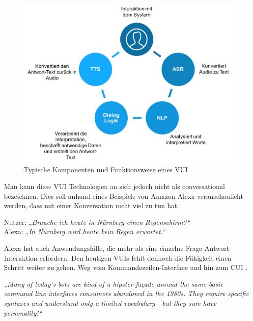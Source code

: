 \begin{figure}[!htb]
    \centering
    \includegraphics[width=\textwidth]{bilder/2_cuiFunktionsweise.png}
    \caption{Typische Komponenten und Funktionsweise eines VUI}
    \label{fig:cui-funktionsweise}
\end{figure}

Man kann diese \ac{VUI} Technologien an sich jedoch nicht als conversational bezeichnen. Dies soll anhand eines Beispiels von Amazon Alexa veranschaulicht werden, dass mit einer Konversation nicht viel zu tun hat.
 
\begin{center}
Nutzer: \textit{„Brauche ich heute in Nürnberg einen Regenschirm?“}\\
\textcolor{mybluelight}{Alexa: \textit{„In Nürnberg wird heute kein Regen erwartet.“}}\\
\end{center}

Alexa hat auch Anwendungsfälle, die mehr als eine einzelne Frage-Antwort-Interaktion erfordern. Den heutigen \acp{VUI} fehlt dennoch die Fähigkeit einen Schritt weiter zu gehen. Weg vom Kommandozeilen-Interface und hin zum \ac{CUI} \cite{pearl-design-vui}.

\begin{center}
\textit{„Many of today’s bots are kind of a hipster façade around the same basic command line interfaces consumers abandoned in the 1980s. They require specific syntaxes and understand only a limited vocabulary—but they sure have personality!“} \cite{hipster-facade-textio}
\end{center}

